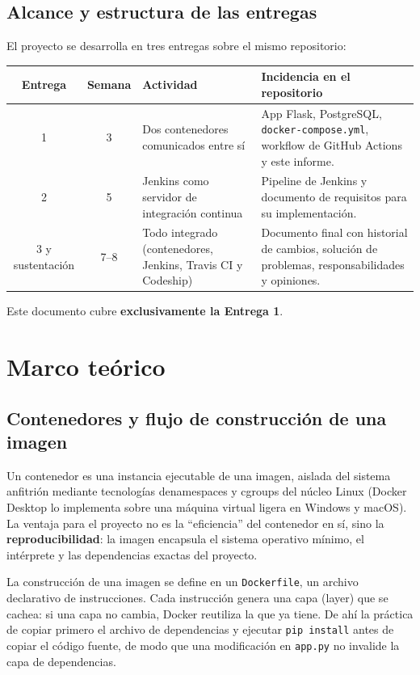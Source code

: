 \documentclass[12pt,a4paper]{article}
\begin{document}
\subsection{Alcance y estructura de las entregas}

El proyecto se desarrolla en tres entregas sobre el mismo repositorio:

\begin{center}
\begin{tabularx}{\textwidth}{c c X X}
\toprule
\textbf{Entrega} & \textbf{Semana} & \textbf{Actividad} & \textbf{Incidencia en el repositorio} \\
\midrule
1 & 3 & Dos contenedores comunicados entre s\'i & App Flask, PostgreSQL, \texttt{docker-compose.yml}, workflow de GitHub Actions y este informe. \\
2 & 5 & Jenkins como servidor de integraci\'on continua & Pipeline de Jenkins y documento de requisitos para su implementaci\'on. \\
3 y sustentaci\'on & 7--8 & Todo integrado (contenedores, Jenkins, Travis CI y Codeship) & Documento final con historial de cambios, soluci\'on de problemas, responsabilidades y opiniones. \\
\bottomrule
\end{tabularx}
\end{center}

Este documento cubre \textbf{exclusivamente la Entrega 1}.

\section{Marco te\'orico}

\subsection{Contenedores y flujo de construcci\'on de una imagen}

Un contenedor es una instancia ejecutable de una imagen, aislada del sistema anfitri\'on
mediante tecnolog\'ias denamespaces y cgroups del n\'ucleo Linux (Docker Desktop lo
implementa sobre una m\'aquina virtual ligera en Windows y macOS). La ventaja para el
proyecto no es la ``eficiencia'' del contenedor en s\'i, sino la \textbf{reproducibilidad}: la
imagen encapsula el sistema operativo m\'inimo, el int\'erprete y las dependencias exactas
del proyecto.

La construcci\'on de una imagen se define en un \texttt{Dockerfile}, un archivo declarativo
de instrucciones. Cada instrucci\'on genera una capa (layer) que se cachea: si una capa no
cambia, Docker reutiliza la que ya tiene. De ah\'i la pr\'actica de copiar primero el
archivo de dependencias y ejecutar \texttt{pip install} antes de copiar el c\'odigo fuente,
de modo que una modificaci\'on en \texttt{app.py} no invalide la capa de dependencias.
\end{document}
